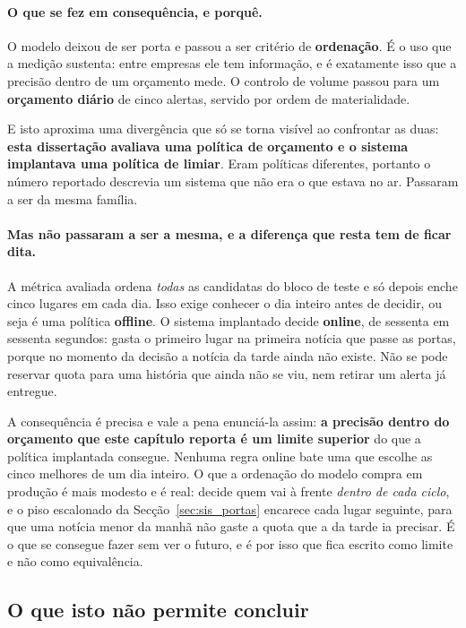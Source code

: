 \paragraph{O que se fez em consequência, e porquê.}
O modelo deixou de ser porta e passou a ser critério de \textbf{ordenação}. É o uso que a medição
sustenta: entre empresas ele tem informação, e é exatamente isso que a precisão dentro de um
orçamento mede. O controlo de volume passou para um \textbf{orçamento diário} de cinco alertas,
servido por ordem de materialidade.

E isto aproxima uma divergência que só se torna visível ao confrontar as duas: \textbf{esta
dissertação avaliava uma política de orçamento e o sistema implantava uma política de limiar}. Eram
políticas diferentes, portanto o número reportado descrevia um sistema que não era o que estava no
ar. Passaram a ser da mesma família.

\paragraph{Mas não passaram a ser a mesma, e a diferença que resta tem de ficar dita.}
A métrica avaliada ordena \emph{todas} as candidatas do bloco de teste e só depois enche cinco
lugares em cada dia. Isso exige conhecer o dia inteiro antes de decidir, ou seja é uma política
\textbf{offline}. O sistema implantado decide \textbf{online}, de sessenta em sessenta segundos:
gasta o primeiro lugar na primeira notícia que passe as portas, porque no momento da decisão a
notícia da tarde ainda não existe. Não se pode reservar quota para uma história que ainda não se
viu, nem retirar um alerta já entregue.

A consequência é precisa e vale a pena enunciá-la assim: \textbf{a precisão dentro do orçamento
que este capítulo reporta é um limite superior} do que a política implantada consegue. Nenhuma
regra online bate uma que escolhe as cinco melhores de um dia inteiro. O que a ordenação do modelo
compra em produção é mais modesto e é real: decide quem vai à frente \emph{dentro de cada ciclo},
e o piso escalonado da Secção~\ref{sec:sis_portas} encarece cada lugar seguinte, para que uma
notícia menor da manhã não gaste a quota que a da tarde ia precisar. É o que se consegue fazer sem
ver o futuro, e é por isso que fica escrito como limite e não como equivalência.

\subsection{O que isto não permite concluir}

